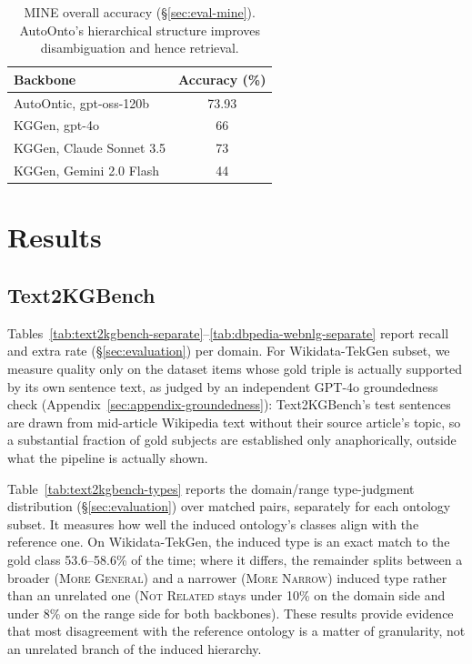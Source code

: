 \documentclass[11pt]{article}
\begin{document}
\begin{table}[t]
\centering
\small
\begin{tabular}{lc}
\toprule
Backbone & Accuracy (\%) \\
\midrule
AutoOntic, gpt-oss-120b & 73.93 \\
KGGen, gpt-4o & 66 \\
KGGen, Claude Sonnet 3.5 & 73 \\
KGGen, Gemini 2.0 Flash & 44 \\
\bottomrule
\end{tabular}
\caption{MINE overall accuracy (\S\ref{sec:eval-mine}). AutoOnto's hierarchical structure improves disambiguation and hence retrieval.}
\label{tab:mine}
\end{table}

\section{Results}
\label{sec:results}

\subsection{Text2KGBench}
\label{sec:results-text2kgbench}

Tables~\ref{tab:text2kgbench-separate}--\ref{tab:dbpedia-webnlg-separate} report recall and extra rate
(\S\ref{sec:evaluation}) per domain. For Wikidata-TekGen subset, we measure quality only on the dataset items
whose gold triple is actually supported by its own sentence text, as
judged by an independent GPT-4o groundedness check
(Appendix~\ref{sec:appendix-groundedness}): Text2KGBench's test sentences
are drawn from mid-article Wikipedia text without their source article's
topic, so a substantial fraction of gold subjects are established only
anaphorically, outside what the pipeline is actually shown. 

Table~\ref{tab:text2kgbench-types} reports the domain/range
type-judgment distribution (\S\ref{sec:evaluation}) over matched pairs, separately for each ontology subset. It measures how well the induced ontology's classes align with the
reference one. On Wikidata-TekGen, the induced type is an exact match to the gold class
53.6--58.6\% of the time; where it differs, the remainder splits between a
broader (\textsc{More General}) and a narrower (\textsc{More Narrow})
induced type rather than an unrelated one (\textsc{Not Related} stays
under 10\% on the domain side and under 8\% on the range side for both backbones). These results provide evidence that most
disagreement with the reference ontology is a matter of granularity, not an unrelated branch of the induced hierarchy.
\end{document}
